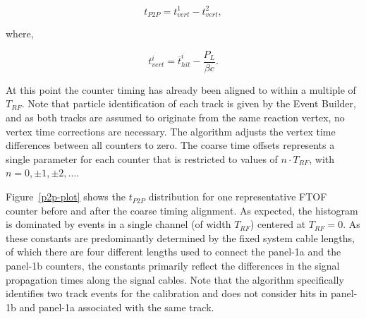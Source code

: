 \documentclass{elsart}
\begin{document}
\begin{equation}
t_{P2P} = t_{vert}^1 - t_{vert}^2,
\end{equation}

\noindent
where,

\begin{equation}
t_{vert}^i = \overline{t}_{hit}^i - \frac{P_L}{\beta c}.
\end{equation}

At this point the counter timing has already been aligned to within a multiple of $T_{RF}$. Note that
particle identification of each track is given by the Event Builder, and as both tracks are assumed to
originate from the same reaction vertex, no vertex time corrections are necessary. The algorithm
adjusts the vertex time differences between all counters to zero. The coarse time offsets represents
a single parameter for each counter that is restricted to values of $n \cdot T_{RF}$, with
$n = 0, \pm 1, \pm 2, ...$.

Figure~\ref{p2p-plot} shows the $t_{P2P}$ distribution for one representative FTOF counter before and
after the coarse timing alignment. As expected, the histogram is dominated by events in a single channel
(of width $T_{RF}$) centered at $T_{RF} = 0$. As these constants are predominantly determined by the
fixed system cable lengths, of which there are four different lengths used to connect the panel-1a and the
panel-1b counters, the constants primarily reflect the differences in the signal propagation times along
the signal cables. Note that the algorithm specifically identifies two track events for the calibration and
does not consider hits in panel-1b and panel-1a associated with the same track.
\end{document}
